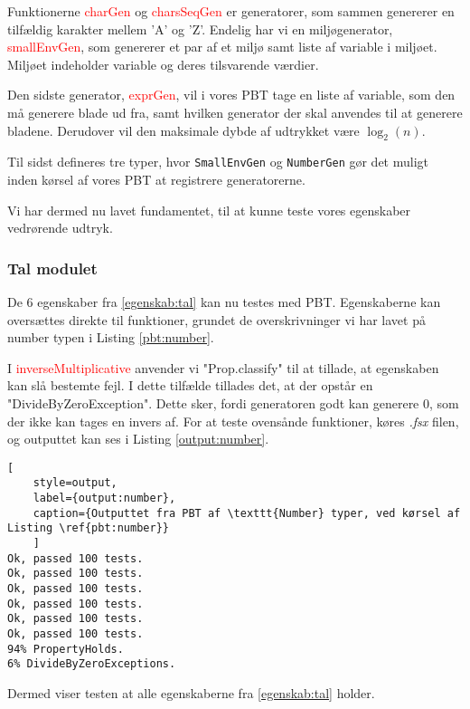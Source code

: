 Funktionerne \textcolor{red}{charGen} og \textcolor{red}{charsSeqGen} er generatorer, som sammen genererer en tilfældig karakter mellem 'A' og 'Z'. Endelig har vi en miljøgenerator, \textcolor{red}{smallEnvGen}, som genererer et par af et miljø samt liste af variable i miljøet. Miljøet indeholder variable og deres tilsvarende værdier.

Den sidste generator, \textcolor{red}{exprGen}, vil i vores PBT tage en liste af variable, som den må generere blade ud fra, samt hvilken generator der skal anvendes til at generere bladene. Derudover vil den maksimale dybde af udtrykket være \(\log_2(n)\).

Til sidst defineres tre typer, hvor \texttt{SmallEnvGen} og \texttt{NumberGen} gør det muligt inden kørsel af vores PBT at registrere generatorerne.

Vi har dermed nu lavet fundamentet, til at kunne teste vores egenskaber vedrørende udtryk.

\subsubsection{Tal modulet}\label{sec:PBT_number}
De 6 egenskaber fra \ref{egenskab:tal} kan nu testes med PBT. Egenskaberne kan oversættes direkte til funktioner, grundet de overskrivninger vi har lavet på number typen i Listing \ref{pbt:number}. 


I \textcolor{red}{inverseMultiplicative} anvender vi "Prop.classify" til at tillade, at egenskaben kan slå bestemte fejl. I dette tilfælde tillades det, at der opstår en "DivideByZeroException". Dette sker, fordi generatoren godt kan generere 0, som der ikke kan tages en invers af. For at teste ovensånde funktioner, køres \textit{.fsx} filen, og outputtet kan ses i Listing \ref{output:number}.
\begin{lstlisting}[
    style=output, 
    label={output:number}, 
    caption={Outputtet fra PBT af \texttt{Number} typer, ved kørsel af Listing \ref{pbt:number}}
    ]        
Ok, passed 100 tests.
Ok, passed 100 tests.
Ok, passed 100 tests.
Ok, passed 100 tests.
Ok, passed 100 tests.
Ok, passed 100 tests.
94% PropertyHolds.
6% DivideByZeroExceptions.
\end{lstlisting}

Dermed viser testen at alle egenskaberne fra \ref{egenskab:tal} holder. 


